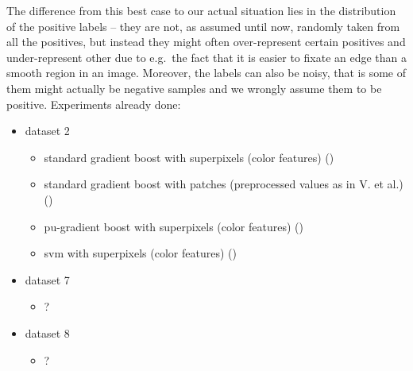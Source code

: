 The difference from this best case to our actual situation lies in the distribution of the positive labels -- they are not, as assumed until now, randomly taken from all the positives, but instead they might often over-represent certain positives and under-represent other due to e.g.\ the fact that it is easier to fixate an edge than a smooth region in an image. Moreover, the labels can also be noisy, that is some of them might actually be negative samples and we wrongly assume them to be positive. Experiments already done:
\begin{itemize}
\item dataset 2
  \begin{itemize}
  \item standard gradient boost with superpixels (color features) ()
  \item standard gradient boost with patches (preprocessed values as in V. et al.) ()
  \item pu-gradient boost with superpixels (color features) ()
  \item svm with superpixels (color features) ()
  \end{itemize}
\item dataset 7
  \begin{itemize}
  \item ?
  \end{itemize}
\item dataset 8
  \begin{itemize}
  \item ?
  \end{itemize}


\end{itemize}




